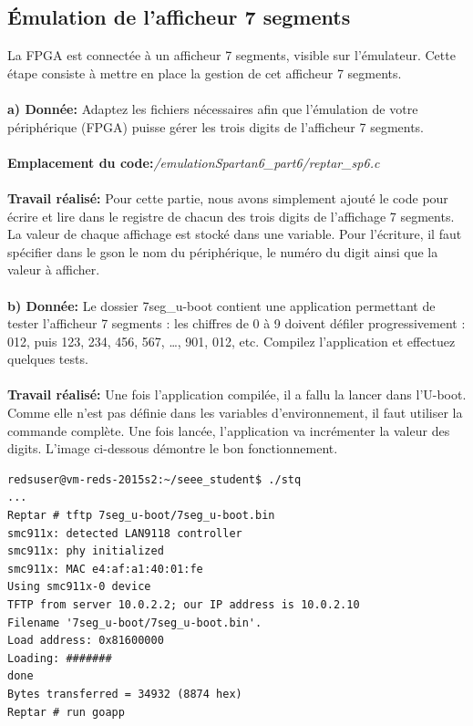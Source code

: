 \subsection{Émulation de l'afficheur 7 segments}
La FPGA est connectée à un afficheur 7 segments, visible sur l’émulateur. Cette étape consiste à mettre
en place la gestion de cet afficheur 7 segments.\\\\
\textbf{a) Donnée: }Adaptez les fichiers nécessaires afin que l'émulation de votre périphérique (FPGA) puisse gérer les
trois digits de l’afficheur 7 segments. \\\\
\textbf{Emplacement du code:}\textit{/emulationSpartan6\_part6/reptar\_sp6.c}\\\\
\textbf{Travail réalisé: }Pour cette partie, nous avons simplement ajouté le code pour écrire et lire dans le registre de chacun des trois digits de l'affichage 7 segments. La valeur de chaque affichage est stocké dans une variable. Pour l'écriture, il faut spécifier dans le gson le nom du périphérique, le numéro du digit ainsi que la valeur à afficher.\\\\
\textbf{b) Donnée: }Le dossier 7seg\_u-boot contient une application permettant de tester l’afficheur 7 segments : les
chiffres de 0 à 9 doivent défiler progressivement : 012, puis 123, 234, 456, 567, …, 901, 012, etc.
Compilez l'application et effectuez quelques tests.\\\\
\textbf{Travail réalisé: }Une fois l'application compilée, il a fallu la lancer dans l'U-boot. Comme elle n'est pas définie dans les variables d'environnement, il faut utiliser la commande complète. Une fois lancée, l'application va incrémenter la valeur des digits. L'image ci-dessous démontre le bon fonctionnement.
\begin{lstlisting}
redsuser@vm-reds-2015s2:~/seee_student$ ./stq
...
Reptar # tftp 7seg_u-boot/7seg_u-boot.bin
smc911x: detected LAN9118 controller
smc911x: phy initialized
smc911x: MAC e4:af:a1:40:01:fe
Using smc911x-0 device
TFTP from server 10.0.2.2; our IP address is 10.0.2.10
Filename '7seg_u-boot/7seg_u-boot.bin'.
Load address: 0x81600000
Loading: #######
done
Bytes transferred = 34932 (8874 hex)
Reptar # run goapp
\end{lstlisting}
